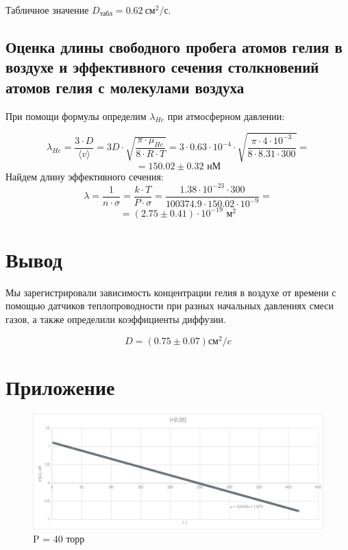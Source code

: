 \documentclass[a4paper, 10pt, twocolumn]{article}
\begin{document}
    Табличное значение $D_{табл} = 0.62~\text{см}^2/\text{с}$.

\subsection{Оценка длины свободного пробега атомов гелия в воздухе и эффективного сечения       
    столкновений атомов гелия с молекулами воздуха}

    При помощи формулы определим $\lambda_{He}$ при атмосферном давлении:

    $$\lambda_{He} = \frac{3 \cdot D}{\langle v \rangle} = 3D \cdot \sqrt{\frac{\pi \cdot \mu_{He}}{8 \cdot R \cdot T}} = 3 \cdot 0.63 \cdot 10^{-4} \cdot \sqrt{\frac{\pi \cdot 4 \cdot 10^{-3}}{8 \cdot 8.31 \cdot 300}} = $$
    $$ = 150.02 \pm 0.32 \text{~нМ} $$
    Найдем длину эффективного сечения: 
    $$\lambda = \frac{1}{n \cdot \sigma} = \frac{k \cdot T}{P \cdot \sigma} = \frac{1.38 \cdot 10^{-23}\cdot 300}{100374.9 \cdot 150.02 \cdot 10^{-9}} = $$
    $$= (2.75 \pm 0.41) \cdot 10^{-19} \text{~м}^2$$

\section{Вывод}

Мы зарегистрировали зависимость концентрации гелия в воздухе от времени с помощью датчиков теплопроводности при разных начальных давлениях смеси газов, а также определили коэффициенты диффузии.

$$ D = (0.75 \pm 0.07) \text{см}^2/c$$

\onecolumn
\section{Приложение}
\begin{figure}[H]
    \centering
    \includegraphics[width=1\linewidth]{graphs/pressure_40.png}
    \begin{center}
        \caption{P = 40 торр}
    \end{center}
\end{figure}
\end{document}
